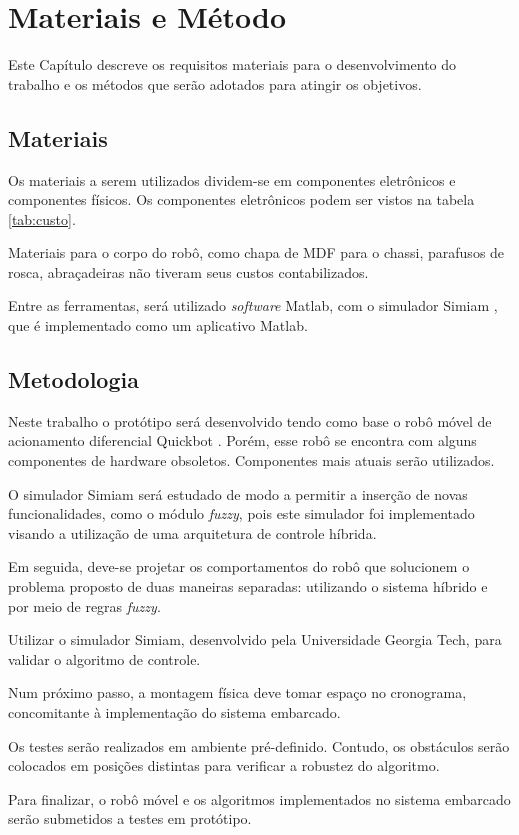 \chapter{Materiais e Método}
\vspace{-2.5 cm}

Este Capítulo descreve os requisitos materiais para o desenvolvimento do
trabalho e os métodos que serão adotados para atingir os objetivos. 

\section{Materiais}

Os materiais a serem utilizados dividem-se em componentes eletrônicos e
componentes físicos. Os componentes eletrônicos podem ser vistos na tabela \ref{tab:custo}.



Materiais para o corpo do robô, como chapa de MDF para o chassi, parafusos
de rosca, abraçadeiras não tiveram seus custos contabilizados.

Entre as ferramentas, será utilizado \textit{software} Matlab, com o
simulador Simiam \cite{Simiam}, que é implementado como um aplicativo Matlab.

\section{Metodologia}

Neste trabalho o protótipo será desenvolvido tendo como base o robô móvel de
acionamento diferencial Quickbot \cite{QuickBot}. Porém, esse robô se encontra
com alguns componentes de hardware obsoletos. Componentes mais atuais serão
utilizados.

O simulador Simiam será estudado de modo a permitir a inserção de novas
funcionalidades, como o módulo \textit{fuzzy}, pois este simulador foi
implementado visando a utilização de uma arquitetura de controle híbrida.  

Em seguida, deve-se projetar os comportamentos do robô que solucionem o problema
proposto de duas maneiras separadas: utilizando o sistema híbrido e por meio de
regras \textit{fuzzy}.

Utilizar o simulador Simiam, desenvolvido pela Universidade Georgia
Tech, para validar o algoritmo de controle.

Num próximo passo, a montagem física deve tomar espaço no cronograma,
concomitante à implementação do sistema embarcado.

Os testes serão realizados em ambiente pré-definido. Contudo, os obstáculos
serão colocados em posições distintas para verificar a robustez do algoritmo. 

Para finalizar, o robô móvel e os algoritmos implementados no sistema embarcado
serão submetidos a testes em protótipo.

